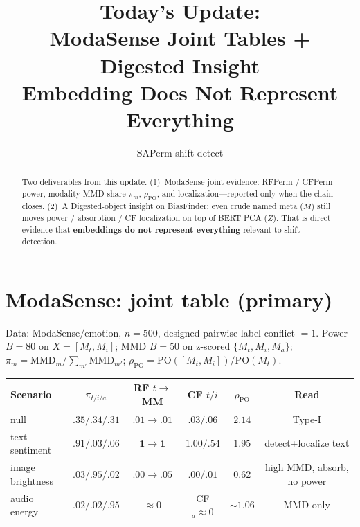 \documentclass[11pt]{article}
\title{Today's Update:\\
ModaSense Joint Tables + Digested Insight\\
{\normalsize Embedding Does Not Represent Everything}}
\author{SAPerm shift-detect}
\date{}
\begin{document}
\maketitle

\begin{abstract}
\noindent
Two deliverables from this update.
(1)~ModaSense joint evidence:
RFPerm / CFPerm power, modality MMD share $\pi_m$, $\rho_{\mathrm{PO}}$,
and localization---reported only when the chain closes.
(2)~A Digested-object insight on BiasFinder:
even crude named meta ($M$) still moves power / absorption / CF localization
on top of BERT PCA ($Z$).
That is direct evidence that \textbf{embeddings do not represent everything}
relevant to shift detection.
\end{abstract}

\section{ModaSense: joint table (primary)}
\label{sec:modasense}
Data: ModaSense/emotion, $n{=}500$, designed pairwise label conflict $=1$.
Power $B{=}80$ on $X{=}[M_t,M_i]$; MMD $B{=}50$ on z-scored
$\{M_t,M_i,M_a\}$; $\pi_m=\mathrm{MMD}_m/\sum_{m'}\mathrm{MMD}_{m'}$;
$\rho_{\mathrm{PO}}=\mathrm{PO}([M_t,M_i])/\mathrm{PO}(M_t)$.

\begin{center}
\small
\begin{tabular}{lccccc}
\toprule
Scenario & $\pi_{t/i/a}$ & RF $t\!\to\!$MM & CF $t/i$ & $\rho_{\mathrm{PO}}$ & Read \\
\midrule
null & $.35/.34/.31$
  & $.01\!\to\!.01$ & $.03/.06$ & $2.14$ & Type-I \\
text sentiment & $\mathbf{.91}/.03/.06$
  & $\mathbf{1\!\to\!1}$ & $\mathbf{1.00}/.54$ & $1.95$
  & detect+localize text \\
image brightness & $.03/\mathbf{.95}/.02$
  & $.00\!\to\!.05$ & $.00/.01$ & $\mathbf{0.62}$
  & high MMD, absorb, no power \\
audio energy & $.02/.02/\mathbf{.95}$
  & $\approx 0$ & CF$_a{\approx}0$ & ${\sim}1.06$
  & MMD-only \\
\bottomrule
\end{tabular}
\end{center}
\end{document}

